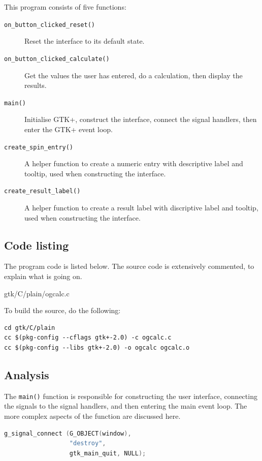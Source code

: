 \documentclass[a4paper,oneside]{article}
\newcommand{\filename}[1]{\texttt{#1}}
\newcommand{\function}[1]{\texttt{#1()}}
\begin{document}
This program consists of five functions:

\begin{description}
\item[\function{on\_button\_clicked\_reset}] Reset the interface to its default state.
\item[\function{on\_button\_clicked\_calculate}] Get the values the user has entered, do
  a calculation, then display the results.
\item[\function{main}] Initialise GTK+, construct the interface,
  connect the signal handlers, then enter the GTK+ event loop.
\item[\function{create\_spin\_entry}] A helper function to create a
  numeric entry with descriptive label and tooltip, used when
  constructing the interface.
\item[\function{create\_result\_label}] A helper function to create a
  result label with discriptive label and tooltip, used when
  constructing the interface.
\end{description}

\subsection{Code listing}

The program code is listed below.  The source code is extensively
commented, to explain what is going on.



                 {gtk/C/plain/ogcalc.c}

To build the source, do the following:

\begin{verbatim}
cd gtk/C/plain
cc $(pkg-config --cflags gtk+-2.0) -c ogcalc.c
cc $(pkg-config --libs gtk+-2.0) -o ogcalc ogcalc.o
\end{verbatim}

\subsection{Analysis}

The \function{main} function is responsible for constructing the user
interface, connecting the signals to the signal handlers, and then
entering the main event loop.  The more complex aspects of the
function are discussed here.

\begin{lstlisting}[numbers=none, language=C]
g_signal_connect (G_OBJECT(window),
                  "destroy",
                  gtk_main_quit, NULL);
\end{lstlisting}
\end{document}
